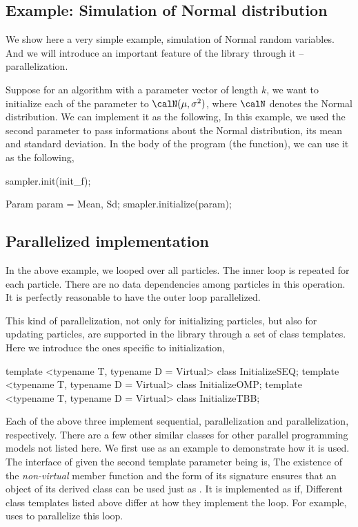 \subsection{Example: Simulation of Normal distribution}
\label{sub:Example: Simulation of Normal distribution}

We show here a very simple example, simulation of Normal random variables.
And we will introduce an important feature of the library through it --
parallelization.

Suppose for an \smc algorithm with a parameter vector of length $k$, we want to
initialize each of the parameter to $\calN(\mu,\sigma^2)$, where $\calN$
denotes the Normal distribution. We can implement it as the following,
In this example, we used the second parameter  to pass
informations about the Normal distribution, its mean and standard deviation.
In the body of the program (the  function), we can use it as
the following,
\begin{cppcode}
sampler.init(init_f);

Param param = {Mean, Sd};
smapler.initialize(param);
\end{cppcode}

\subsection{Parallelized implementation}
\label{sub:Parallelized implementation}

In the above example, we looped over all particles. The inner loop is repeated
for each particle. There are no data dependencies among particles in this
operation. It is perfectly reasonable to have the outer loop parallelized.

This kind of parallelization, not only for initializing particles, but also
for updating particles, are supported in the \vsmc library through a set of
class templates. Here we introduce the ones specific to initialization,
\begin{cppcode}
template <typename T, typename D = Virtual> class InitializeSEQ;
template <typename T, typename D = Virtual> class InitializeOMP;
template <typename T, typename D = Virtual> class InitializeTBB;
\end{cppcode}
Each of the above three implement sequential, \openmp parallelization and \tbb
parallelization, respectively. There are a few other similar classes for other
parallel programming models not listed here. We first use
 as an example to demonstrate how it is used. The
interface of  given the second template parameter
being  is,
The existence of the \emph{non-virtual} member function 
and the form of its signature ensures that an object of its derived class can
be used just as . It is implemented as if,
Different class templates listed above differ at how they implement the loop.
For example,  uses \openmp to parallelize this loop.

